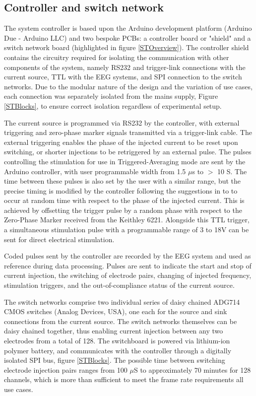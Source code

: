 \subsection{Controller and switch network}

The system controller is based upon the Arduino development platform (Arduino Due - Arduino LLC) and two bespoke PCBs: a controller board or "shield" and a switch network board (highlighted in figure \ref{STOverview}). The controller shield contains the circuitry required for isolating the communication with other components of the system, namely RS232 and trigger-link connections with the current source, TTL with the EEG systems, and SPI connection to the switch networks. Due to the modular nature of the design and the variation of use cases, each connection was separately isolated from the mains supply, Figure \ref{STBlocks}, to ensure correct isolation regardless of experimental setup.

The current source is programmed via RS232 by the controller, with external triggering and zero-phase marker signals transmitted via a trigger-link cable. The external triggering enables the phase of the injected current to be reset upon switching, or shorter injections to be retriggered by an external pulse. The pulses controlling the stimulation for use in Triggered-Averaging mode are sent by the Arduino controller, with user programmable width from 1.5 $\mu$s to $>$ 10 S. The time between these pulses is also set by the user with a similar range, but the precise timing is modified by the controller following the suggestions in \cite{Aristovich_2015} to to occur at random time with respect to the phase of the injected current. This is achieved by offsetting the trigger pulse by a random phase with respect to the Zero-Phase Marker received from the Keithley 6221. Alongside this TTL trigger, a simultaneous stimulation pulse with a programmable range of 3 to 18V can be sent for direct electrical stimulation.

Coded pulses sent by the controller are recorded by the EEG system and used as reference during data processing. Pulses are sent to indicate the start and stop of current injection, the switching of electrode pairs, changing of injected frequency, stimulation triggers, and the out-of-compliance status of the current source. 

The switch networks comprise two individual series of daisy chained ADG714 CMOS switches (Analog Devices, USA), one each for the source and sink connections from the current source. The switch networks themselves can be daisy chained together, thus enabling current injection between any two electrodes from a total of 128. The switchboard is powered via lithium-ion polymer battery, and communicates with the controller through a digitally isolated SPI bus, figure \ref{STBlocks}. The possible time between switching electrode injection pairs ranges from 100 $\mu$S to approximately 70 minutes for 128 channels, which is more than sufficient to meet the frame rate requirements all use cases. 